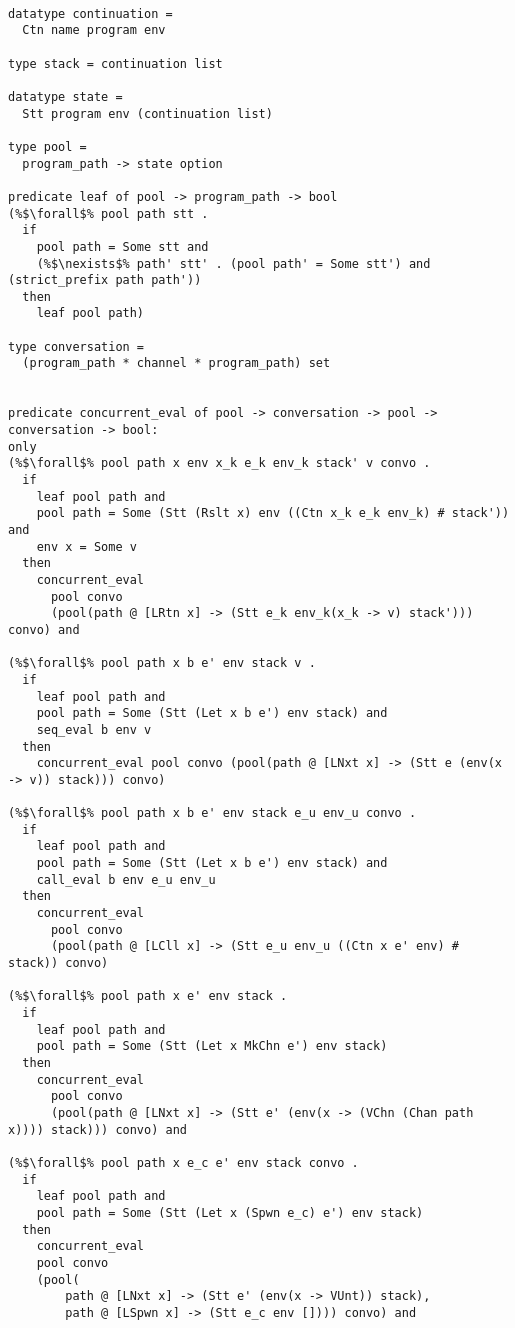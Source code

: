 \documentclass{article}
\begin{document}
\begin{lstlisting}[language=logic, style=codestyle1, escapechar=\%]

datatype continuation =
  Ctn name program env

type stack = continuation list

datatype state =
  Stt program env (continuation list)

type pool =
  program_path -> state option

predicate leaf of pool -> program_path -> bool
(%$\forall$% pool path stt .
  if
    pool path = Some stt and 
    (%$\nexists$% path' stt' . (pool path' = Some stt') and (strict_prefix path path'))
  then
    leaf pool path)

type conversation =
  (program_path * channel * program_path) set


predicate concurrent_eval of pool -> conversation -> pool -> conversation -> bool: 
only
(%$\forall$% pool path x env x_k e_k env_k stack' v convo .
  if
    leaf pool path and
    pool path = Some (Stt (Rslt x) env ((Ctn x_k e_k env_k) # stack')) and
    env x = Some v
  then
    concurrent_eval
      pool convo
      (pool(path @ [LRtn x] -> (Stt e_k env_k(x_k -> v) stack'))) convo) and

(%$\forall$% pool path x b e' env stack v .
  if 
    leaf pool path and
    pool path = Some (Stt (Let x b e') env stack) and
    seq_eval b env v
  then
    concurrent_eval pool convo (pool(path @ [LNxt x] -> (Stt e (env(x -> v)) stack))) convo)

(%$\forall$% pool path x b e' env stack e_u env_u convo .
  if 
    leaf pool path and 
    pool path = Some (Stt (Let x b e') env stack) and
    call_eval b env e_u env_u
  then
    concurrent_eval
      pool convo
      (pool(path @ [LCll x] -> (Stt e_u env_u ((Ctn x e' env) # stack)) convo)

(%$\forall$% pool path x e' env stack .
  if 
    leaf pool path and
    pool path = Some (Stt (Let x MkChn e') env stack)
  then
    concurrent_eval
      pool convo 
      (pool(path @ [LNxt x] -> (Stt e' (env(x -> (VChn (Chan path x)))) stack))) convo) and

(%$\forall$% pool path x e_c e' env stack convo .
  if 
    leaf pool path and 
    pool path = Some (Stt (Let x (Spwn e_c) e') env stack)
  then
    concurrent_eval
    pool convo 
    (pool(
        path @ [LNxt x] -> (Stt e' (env(x -> VUnt)) stack),
        path @ [LSpwn x] -> (Stt e_c env []))) convo) and


\end{lstlisting}
\end{document}
